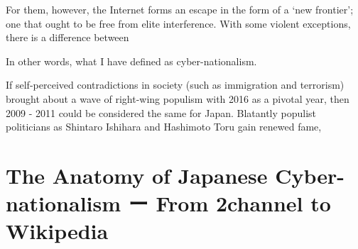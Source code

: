 \documentclass[10pt,british,A4paper,,openany]{memoir}
\begin{document}
For them, however, the Internet forms an escape in the form of a `new
frontier'; one that ought to be free from elite interference. With some
violent exceptions, there is a difference between

In other words, what I have defined as cyber-nationalism.

If self-perceived contradictions in society (such as immigration and
terrorism) brought about a wave of right-wing populism with 2016 as a
pivotal year, then 2009 - 2011 could be considered the same for Japan.
Blatantly populist politicians as Shintaro Ishihara and Hashimoto Toru
gain renewed fame,

\chapter{The Anatomy of Japanese Cyber-nationalism ー From 2channel to
Wikipedia}\label{the-anatomy-of-japanese-cyber-nationalism-ux30fc-from-2channel-to-wikipedia}
\end{document}
